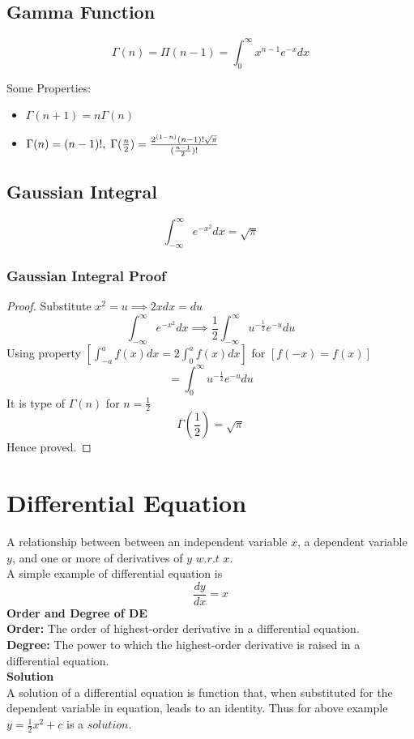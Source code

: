 \documentclass[12pt]{article}
\begin{document}
\subsection{Gamma Function}
$$\Gamma(n)=\Pi(n-1)= \int_{0}^{\infty}x^{n-1}e^{-x}dx$$

Some Properties:
\begin{itemize}
\item $\Gamma(n+1)=n \Gamma(n)$
\item $\Gamma(n)=(n-1)!, \thickspace \Gamma(\frac{n}{2})=\frac{2^{(1-n)} (n-1)!\sqrt{\pi}}{(\frac{n-1}{2})!}$
\end{itemize}
\subsection{Gaussian Integral}
$$\int_{-\infty}^{\infty}e^{-x^{2}}dx=\sqrt{\pi}$$
\subsubsection{Gaussian Integral Proof}
\begin{proof}
Substitute $x^2=u \implies 2xdx=du$ \\
$$\int_{-\infty}^{\infty}e^{-x^{2}}dx \implies \frac{1}{2}\int_{-\infty}^{\infty} u^{-\frac{1}{2}}e^{-u}du$$
Using property $[\int_{-a}^{a}f(x)dx=2 \int_{0}^{a}f(x)dx]$ for $[f(-x)=f(x)]$ \\
$$=\int_{0}^{\infty} u^{-\frac{1}{2}}e^{-u}du$$
It is type of $\Gamma(n)$ for $n=\frac{1}{2}$
$$\Gamma(\frac{1}{2})=\sqrt{\pi}$$
Hence proved.
\end{proof}
\section{Differential Equation}
A relationship between between an independent variable $x$, a dependent variable $y$, and one or more of derivatives of $y$ $w.r.t$ $x$. \\
A simple example of differential equation is \\
$$\frac{dy}{dx}=x$$
\textbf{Order and Degree of DE}\\
\textbf{Order:} The order of highest-order derivative in a differential equation. \\
\textbf{Degree:} The power to which the highest-order derivative is raised in a differential equation.\\
\textbf{Solution}\\
A solution of a differential equation is function that, when substituted for the dependent variable in equation, leads to an identity. Thus for above example $y=\frac{1}{2}x^2+c$ is a $solution.$
\end{document}
